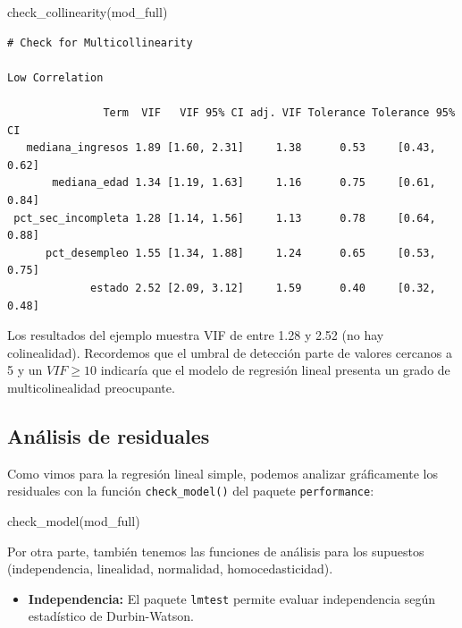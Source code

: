 \documentclass[
  spanish,
  a4paper,
]{scrbook}
\newenvironment{Shaded}{\begin{snugshade}}{\end{snugshade}}
\newcommand{\FunctionTok}[1]{\textcolor[rgb]{0.28,0.35,0.67}{#1}}
\newcommand{\NormalTok}[1]{\textcolor[rgb]{0.00,0.23,0.31}{#1}}
\providecommand{\tightlist}{%
  \setlength{\itemsep}{0pt}\setlength{\parskip}{0pt}}
\begin{document}
\begin{Shaded}
\begin{Highlighting}[]
\FunctionTok{check\_collinearity}\NormalTok{(mod\_full)}
\end{Highlighting}
\end{Shaded}

\begin{verbatim}
# Check for Multicollinearity

Low Correlation

               Term  VIF   VIF 95% CI adj. VIF Tolerance Tolerance 95% CI
   mediana_ingresos 1.89 [1.60, 2.31]     1.38      0.53     [0.43, 0.62]
       mediana_edad 1.34 [1.19, 1.63]     1.16      0.75     [0.61, 0.84]
 pct_sec_incompleta 1.28 [1.14, 1.56]     1.13      0.78     [0.64, 0.88]
      pct_desempleo 1.55 [1.34, 1.88]     1.24      0.65     [0.53, 0.75]
             estado 2.52 [2.09, 3.12]     1.59      0.40     [0.32, 0.48]
\end{verbatim}

Los resultados del ejemplo muestra VIF de entre 1.28 y 2.52 (no hay
colinealidad). Recordemos que el umbral de detección parte de valores
cercanos a 5 y un \(VIF \geq 10\) indicaría que el modelo de regresión
lineal presenta un grado de multicolinealidad preocupante.

\subsection{Análisis de residuales}\label{anuxe1lisis-de-residuales-1}

Como vimos para la regresión lineal simple, podemos analizar
gráficamente los residuales con la función \texttt{check\_model()} del
paquete \texttt{performance}:

\begin{Shaded}
\begin{Highlighting}[]
\FunctionTok{check\_model}\NormalTok{(mod\_full)}
\end{Highlighting}
\end{Shaded}

Por otra parte, también tenemos las funciones de análisis para los
supuestos (independencia, linealidad, normalidad, homocedasticidad).

\begin{itemize}
\tightlist
\item
  \textbf{Independencia:} El paquete \texttt{lmtest} permite evaluar
  independencia según estadístico de Durbin-Watson.
\end{itemize}
\end{document}
